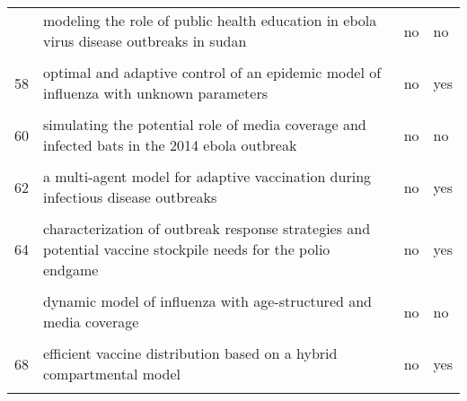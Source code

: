 \documentclass[
]{article}
\begin{document}
\begin{landscape}
\begin{longtable}{l>{\raggedright\arraybackslash}p{4cm}l>{\raggedright\arraybackslash}p{4cm}}
\addlinespace
56 & modeling the role of public health education in ebola virus disease outbreaks in sudan & no & no\\
\cellcolor{gray!6}{57} & \cellcolor{gray!6}{modelling the transmission and control strategies of varicella among school children in shenzhen, china} & \cellcolor{gray!6}{no} & \cellcolor{gray!6}{yes}\\
58 & optimal and adaptive control of an epidemic model of influenza with unknown parameters & no & yes\\
\cellcolor{gray!6}{59} & \cellcolor{gray!6}{simulating endogenous dynamics of intervention-capacity deployment: ebola outbreak in liberia} & \cellcolor{gray!6}{no} & \cellcolor{gray!6}{yes}\\
60 & simulating the potential role of media coverage and infected bats in the 2014 ebola outbreak & no & no\\
\addlinespace
\cellcolor{gray!6}{61} & \cellcolor{gray!6}{a mathematical model of ebola virus disease: using sensitivity analysis to determine effective intervention targets} & \cellcolor{gray!6}{no} & \cellcolor{gray!6}{no}\\
62 & a multi-agent model for adaptive vaccination during infectious disease outbreaks & no & yes\\
\cellcolor{gray!6}{63} & \cellcolor{gray!6}{assessing the efficiency of movement restriction as a control strategy of ebola} & \cellcolor{gray!6}{no} & \cellcolor{gray!6}{no}\\
64 & characterization of outbreak response strategies and potential vaccine stockpile needs for the polio endgame & no & yes\\
\cellcolor{gray!6}{65} & \cellcolor{gray!6}{designing public health policies to mitigate the adverse consequences of rural-urban migration via meta-population modeling} & \cellcolor{gray!6}{no} & \cellcolor{gray!6}{yes}\\
\addlinespace
66 & dynamic model of influenza with age-structured and media coverage & no & no\\
\cellcolor{gray!6}{67} & \cellcolor{gray!6}{economic evaluation of individual school closure strategies: the hong kong 2009 h1n1 pandemic} & \cellcolor{gray!6}{no} & \cellcolor{gray!6}{no}\\
68 & efficient vaccine distribution based on a hybrid compartmental model & no & yes\\
\cellcolor{gray!6}{69} & \cellcolor{gray!6}{epidemiological evaluation of different fmd control strategies in two selected regions in austria} & \cellcolor{gray!6}{no} & \cellcolor{gray!6}{yes}\\

\end{longtable}
\end{landscape}
\end{document}
